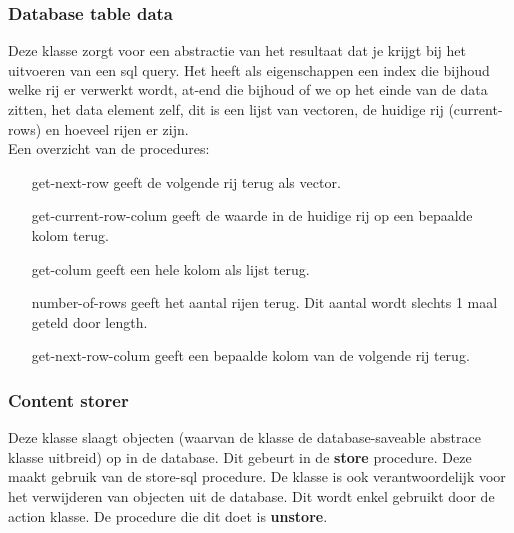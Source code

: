 \documentclass{article}
\begin{document}
\subsubsection{Database table data}
\label{ssub:db-table-data}
Deze klasse zorgt voor een abstractie van het resultaat dat je krijgt bij het uitvoeren van een sql query. Het heeft als eigenschappen een index die bijhoud welke rij er verwerkt wordt, at-end die bijhoud of we op het einde van de data zitten, het data element zelf, dit is een lijst van vectoren,  de huidige rij (current-rows) en hoeveel rijen er zijn.\\
Een overzicht van de procedures:
\begin{itemize}
	\item[get-next-row] geeft de volgende rij terug als vector.
	\item[get-current-row-colum] geeft de waarde in de huidige rij op een bepaalde kolom terug.
	\item[get-colum] geeft een hele kolom als lijst terug.
	\item[number-of-rows] geeft het aantal rijen terug. Dit aantal wordt slechts 1 maal geteld door length.
	\item[get-next-row-colum] geeft een bepaalde kolom van de volgende rij terug. 
\end{itemize}

\subsubsection{Content storer}
\label{ssub:content-storer}
Deze klasse slaagt objecten (waarvan de klasse de database-saveable abstrace klasse uitbreid) op in de database. Dit gebeurt in de \textbf{store} procedure. Deze maakt gebruik van de store-sql procedure. De klasse is ook verantwoordelijk voor het verwijderen van objecten uit de database. Dit wordt enkel gebruikt door de action klasse. De procedure die dit doet is \textbf{unstore}.
\end{document}
